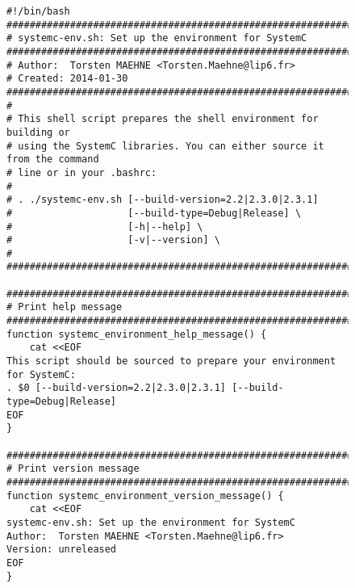 \newpage
\begin{figure}[h]
\begin{verbatim}
#!/bin/bash
########################################################################
# systemc-env.sh: Set up the environment for SystemC
########################################################################
# Author:  Torsten MAEHNE <Torsten.Maehne@lip6.fr>
# Created: 2014-01-30
########################################################################
#
# This shell script prepares the shell environment for building or
# using the SystemC libraries. You can either source it from the command
# line or in your .bashrc:
#
# . ./systemc-env.sh [--build-version=2.2|2.3.0|2.3.1]
#                    [--build-type=Debug|Release] \
#                    [-h|--help] \
#                    [-v|--version] \
#
########################################################################

########################################################################
# Print help message
########################################################################
function systemc_environment_help_message() {
    cat <<EOF
This script should be sourced to prepare your environment for SystemC:
. $0 [--build-version=2.2|2.3.0|2.3.1] [--build-type=Debug|Release]
EOF
}

########################################################################
# Print version message
########################################################################
function systemc_environment_version_message() {
    cat <<EOF
systemc-env.sh: Set up the environment for SystemC
Author:  Torsten MAEHNE <Torsten.Maehne@lip6.fr>
Version: unreleased
EOF
}
\end{verbatim}
\end{figure}

